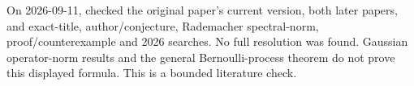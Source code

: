 \documentclass[11pt,a4paper]{article}
\begin{document}
On 2026-09-11, checked the original paper's current version, both later
papers, and exact-title, author/conjecture, Rademacher spectral-norm,
proof/counterexample and 2026 searches. No full resolution was found.
Gaussian operator-norm results and the general Bernoulli-process theorem
do not prove this displayed formula. This is a bounded literature check.
\end{document}
